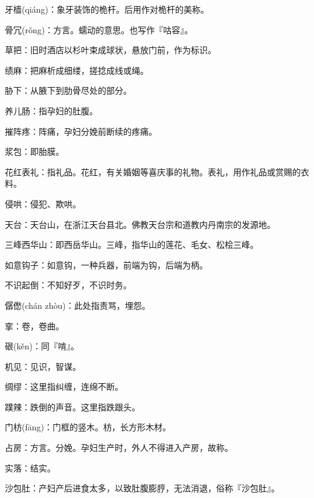 \startbuffer[1630]
牙樯(qiáng)：象牙装饰的桅杆。后用作对桅杆的美称。
\stopbuffer


\startbuffer[1631]
骨冗(rǒng)：方言。蠕动的意思。也写作『咕容』。
\stopbuffer


\startbuffer[1632]
草把：旧时酒店以杉叶束成球状，悬放门前，作为标识。
\stopbuffer


\startbuffer[1633]
绩麻：把麻析成细缕，搓捻成线或绳。
\stopbuffer


\startbuffer[1634]
胁下：从腋下到肋骨尽处的部分。
\stopbuffer


\startbuffer[1635]
养儿肠：指孕妇的肚腹。
\stopbuffer


\startbuffer[1636]
摧阵疼：阵痛，孕妇分娩前断续的疼痛。
\stopbuffer


\startbuffer[1637]
浆包：即胎膜。
\stopbuffer


\startbuffer[1638]
花红表礼：指礼品。花红，有关婚姻等喜庆事的礼物。表礼，用作礼品或赏赐的衣料。
\stopbuffer


\startbuffer[1639]
侵哄：侵犯、欺哄。
\stopbuffer


\startbuffer[1640]
天台：天台山，在浙江天台县北。佛教天台宗和道教内丹南宗的发源地。
\stopbuffer


\startbuffer[1641]
三峰西华山：即西岳华山。三峰，指华山的莲花、毛女、松桧三峰。
\stopbuffer


\startbuffer[1642]
如意钩子：如意钩，一种兵器，前端为钩，后端为柄。
\stopbuffer


\startbuffer[1643]
不识起倒：不知好歹，不识时务。
\stopbuffer


\startbuffer[1644]
僝僽(chán zhòu)：此处指责骂，埋怨。
\stopbuffer


\startbuffer[1645]
挛：卷，卷曲。
\stopbuffer


\startbuffer[1646]
硍(kěn)：同『啃』。
\stopbuffer


\startbuffer[1647]
机见：见识，智谋。
\stopbuffer


\startbuffer[1648]
绸缪：这里指纠缠，连绵不断。
\stopbuffer


\startbuffer[1649]
蹼辣：跌倒的声音。这里指跌跟头。
\stopbuffer


\startbuffer[1650]
门枋(fāng)：门框的竖木。枋，长方形木材。
\stopbuffer


\startbuffer[1651]
占房：方言。分娩。孕妇生产时，外人不得进入产房，故称。
\stopbuffer


\startbuffer[1652]
实落：结实。
\stopbuffer


\startbuffer[1653]
沙包肚：产妇产后进食太多，以致肚腹膨脝，无法消退，俗称『沙包肚』。
\stopbuffer


